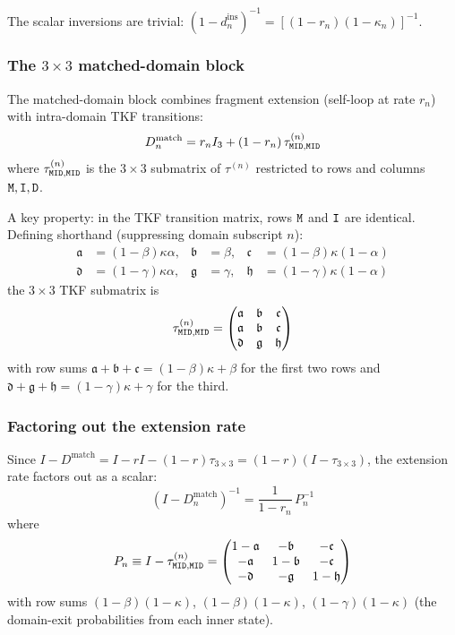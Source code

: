 \documentclass{article}
\newcommand\ext{r}
\newcommand\dom{n}
\newcommand\tkftrans{\tau}
\newcommand\mat{{\tt M}}
\newcommand\ins{{\tt I}}
\newcommand\del{{\tt D}}
\begin{document}
The scalar inversions are trivial:
$(1 - d_\dom^{\text{ins}})^{-1} = [(1-\ext_\dom)(1-\kappa_\dom)]^{-1}$.

\subsubsection{\texorpdfstring{The $3\times 3$ matched-domain block}{The 3 x 3 matched-domain block}}

The matched-domain block combines fragment extension (self-loop at rate
$\ext_\dom$) with intra-domain TKF transitions:
\[
D_\dom^{\text{match}} = \ext_\dom I_3 + (1 - \ext_\dom)\, \tkftrans_{\mat\ins\del,\mat\ins\del}^{(\dom)}
\]
where $\tkftrans_{\mat\ins\del,\mat\ins\del}^{(\dom)}$ is the
$3 \times 3$ submatrix of $\tkftrans^{(\dom)}$ restricted to rows and
columns $\mat, \ins, \del$.

A key property: in the TKF transition matrix, rows $\mat$ and $\ins$
are identical. Defining shorthand (suppressing domain subscript $\dom$):
\begin{align*}
\mathfrak{a} &= (1-\beta)\kappa\alpha, &
\mathfrak{b} &= \beta, &
\mathfrak{c} &= (1-\beta)\kappa(1-\alpha) \\
\mathfrak{d} &= (1-\gamma)\kappa\alpha, &
\mathfrak{g} &= \gamma, &
\mathfrak{h} &= (1-\gamma)\kappa(1-\alpha)
\end{align*}
the $3 \times 3$ TKF submatrix is
\[
\tkftrans_{\mat\ins\del,\mat\ins\del}^{(\dom)} =
\begin{pmatrix}
\mathfrak{a} & \mathfrak{b} & \mathfrak{c} \\
\mathfrak{a} & \mathfrak{b} & \mathfrak{c} \\
\mathfrak{d} & \mathfrak{g} & \mathfrak{h}
\end{pmatrix}
\]
with row sums $\mathfrak{a}+\mathfrak{b}+\mathfrak{c} = (1-\beta)\kappa + \beta$ for the first two rows
and $\mathfrak{d}+\mathfrak{g}+\mathfrak{h} = (1-\gamma)\kappa + \gamma$ for the third.

\subsubsection{Factoring out the extension rate}

Since $I - D^{\text{match}} = I - \ext I - (1-\ext)\tkftrans_{3\times 3}
= (1-\ext)(I - \tkftrans_{3\times 3})$,
the extension rate factors out as a scalar:
\[
(I - D_\dom^{\text{match}})^{-1} = \frac{1}{1-\ext_\dom}\, P_\dom^{-1}
\]
where
\[
P_\dom \equiv I - \tkftrans_{\mat\ins\del,\mat\ins\del}^{(\dom)} =
\begin{pmatrix}
1-\mathfrak{a} & -\mathfrak{b} & -\mathfrak{c} \\
-\mathfrak{a} & 1-\mathfrak{b} & -\mathfrak{c} \\
-\mathfrak{d} & -\mathfrak{g} & 1-\mathfrak{h}
\end{pmatrix}
\]
with row sums $(1-\beta)(1-\kappa)$, $(1-\beta)(1-\kappa)$, $(1-\gamma)(1-\kappa)$
(the domain-exit probabilities from each inner state).
\end{document}
